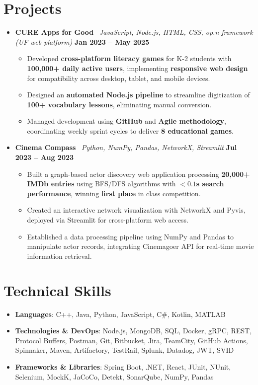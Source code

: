 \documentclass[letterpaper,10pt]{article}
\newcommand{\resumeSubheadingListStart}{\begin{itemize}[leftmargin=0pt,label={},itemsep=2pt]}
\newcommand{\resumeSubheadingListEnd}{\end{itemize}}
\newcommand{\resumeItemListStart}{\begin{itemize}[label=\textbullet,leftmargin=0.2in,itemsep=1pt]}
\newcommand{\resumeItemListEnd}{\end{itemize}}
\newcommand{\resumeSubheadingOneLine}[3]{\item \textbf{#1} \textbar\ \textit{#2} \hfill\textbf{#3}}
\newcommand{\resumeItem}[1]{\item #1}
\begin{document}
\section{\textbf{Projects}}
\resumeSubheadingListStart
  \resumeSubheadingOneLine{CURE Apps for Good}{JavaScript, Node.js, HTML, CSS, op.n framework (UF web platform)}{Jan 2023 -- May 2025}
  \resumeItemListStart
    \resumeItem{Developed \textbf{cross-platform literacy games} for K-2 students with \textbf{100,000+ daily active users}, implementing \textbf{responsive web design} for compatibility across desktop, tablet, and mobile devices.}
    \resumeItem{Designed an \textbf{automated Node.js pipeline} to streamline digitization of \textbf{100+ vocabulary lessons}, eliminating manual conversion.}
    \resumeItem{Managed development using \textbf{GitHub} and \textbf{Agile methodology}, coordinating weekly sprint cycles to deliver \textbf{8 educational games}.}
  \resumeItemListEnd

  \resumeSubheadingOneLine{Cinema Compass}{Python, NumPy, Pandas, NetworkX, Streamlit}{Jul 2023 -- Aug 2023}
  \resumeItemListStart
    \resumeItem{Built a graph-based actor discovery web application processing \textbf{20,000+ IMDb entries} using BFS/DFS algorithms with $<\!\mathbf{0.1}$\textbf{s search performance}, winning \textbf{first place} in class competition.}
    \resumeItem{Created an interactive network visualization with NetworkX and Pyvis, deployed via Streamlit for cross-platform web access.}
    \resumeItem{Established a data processing pipeline using NumPy and Pandas to manipulate actor records, integrating Cinemagoer API for real-time movie information retrieval.}
  \resumeItemListEnd
\resumeSubheadingListEnd

\section{\textbf{Technical Skills}}
\resumeSubheadingListStart
  \item{\textbf{Languages}: C++, Java, Python, JavaScript, C\#, Kotlin, MATLAB}
  \item{\textbf{Technologies \& DevOps}: Node.js, MongoDB, SQL, Docker, gRPC, REST, Protocol Buffers, Postman, Git, Bitbucket, Jira, TeamCity, GitHub Actions, Spinnaker, Maven, Artifactory, TestRail, Splunk, Datadog, JWT, SVID}
  \item{\textbf{Frameworks \& Libraries}: Spring Boot, .NET, React, JUnit, NUnit, Selenium, MockK, JaCoCo, Detekt, SonarQube, NumPy, Pandas}
\resumeSubheadingListEnd
\end{document}
